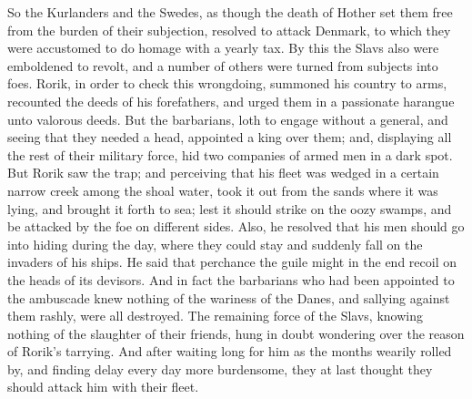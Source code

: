\documentclass[10pt,a4paper]{report}
\begin{document}
So the Kurlanders and the Swedes, as though the death of Hother set them free from the burden of their subjection, resolved to attack Denmark, to which they were accustomed to do homage with a yearly tax. By this the Slavs also were emboldened to revolt, and a number of others were turned from subjects into foes. Rorik, in order to check this wrongdoing, summoned his country to arms, recounted the deeds of his forefathers, and urged them in a passionate harangue unto valorous deeds. But the barbarians, loth to engage without a general, and seeing that they needed a head, appointed a king over them; and, displaying all the rest of their military force, hid two companies of armed men in a dark spot. But Rorik saw the trap; and perceiving that his fleet was wedged in a certain narrow creek among the shoal water, took it out from the sands where it was lying, and brought it forth to sea; lest it should strike on the oozy swamps, and be attacked by the foe on different sides. Also, he resolved that his men should go into hiding during the day, where they could stay and suddenly fall on the invaders of his ships. He said that perchance the guile might in the end recoil on the heads of its devisors. And in fact the barbarians who had been appointed to the ambuscade knew nothing of the wariness of the Danes, and sallying against them rashly, were all destroyed. The remaining force of the Slavs, knowing nothing of the slaughter of their friends, hung in doubt wondering over the reason of Rorik's tarrying. And after waiting long for him as the months wearily rolled by, and finding delay every day more burdensome, they at last thought they should attack him with their fleet.\\
\end{document}

